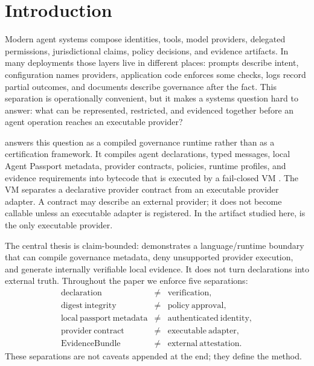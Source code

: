 \section{Introduction}\label{sec:introduction}

Modern agent systems compose identities, tools, model providers, delegated
permissions, jurisdictional claims, policy decisions, and evidence artifacts.
In many deployments those layers live in different places: prompts describe
intent, configuration names providers, application code enforces some checks,
logs record partial outcomes, and documents describe governance after the
fact.  This separation is operationally convenient, but it makes a systems
question hard to answer: what can be represented, restricted, and evidenced
together before an agent operation reaches an executable provider?

\Argorix answers this question as a compiled governance runtime rather than as
a certification framework.  It compiles agent declarations, typed messages,
local Agent Passport metadata, provider contracts, policies, runtime profiles,
and evidence requirements into bytecode that is executed by a fail-closed VM
\citep{argorixlang2026}.  The VM separates a declarative provider contract from
an executable provider adapter.  A contract may describe an external provider;
it does not become callable unless an executable adapter is registered.  In the
artifact studied here,  is the only executable provider.

The central thesis is claim-bounded: \Argorix demonstrates a language/runtime
boundary that can compile governance metadata, deny unsupported provider
execution, and generate internally verifiable local evidence.  It does not
turn declarations into external truth.  Throughout the paper we enforce five
separations:
\[
\begin{array}{rcl}
\mathrm{declaration} & \ne & \mathrm{verification},\\
\mathrm{digest\ integrity} & \ne & \mathrm{policy\ approval},\\
\mathrm{local\ passport\ metadata} & \ne & \mathrm{authenticated\ identity},\\
\mathrm{provider\ contract} & \ne & \mathrm{executable\ adapter},\\
\mathrm{EvidenceBundle} & \ne & \mathrm{external\ attestation}.
\end{array}
\]
These separations are not caveats appended at the end; they define the method.

